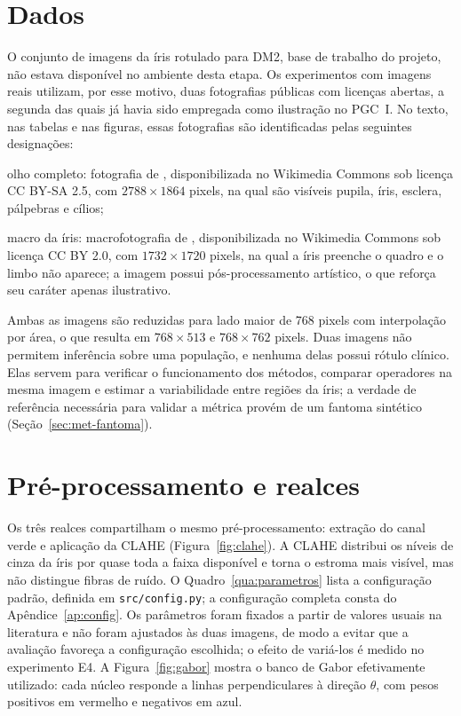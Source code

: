 \documentclass[12pt, oneside, a4paper, chapter=TITLE, section=TITLE,
               english, brazil]{abntex2}
\newcommand{\secao}[1]{\section[\texorpdfstring{\protect\MakeTextUppercase{#1}}{#1}]{#1}}
\newcommand{\arq}[1]{\nolinkurl{#1}}
\begin{document}
\secao{Dados}
\label{sec:met-dados}

O conjunto de imagens da íris rotulado para DM2, base de trabalho do projeto,
não estava disponível no ambiente desta etapa. Os experimentos com imagens
reais utilizam, por esse motivo, duas fotografias públicas com licenças
abertas, a segunda das quais já havia sido empregada como ilustração no
PGC~I. No texto, nas tabelas e nas figuras, essas fotografias são
identificadas pelas seguintes designações:
\begin{alineas}
  \item olho completo: fotografia de \citet{Novak2005}, disponibilizada no
  Wikimedia Commons sob licença CC BY-SA 2.5, com $2788 \times 1864$ pixels,
  na qual são visíveis pupila, íris, esclera, pálpebras e cílios;
  \item macro da íris: macrofotografia de \citet{Reyes2014}, disponibilizada
  no Wikimedia Commons sob licença CC BY 2.0, com $1732 \times 1720$ pixels,
  na qual a íris preenche o quadro e o limbo não aparece; a imagem possui
  pós-processamento artístico, o que reforça seu caráter apenas ilustrativo.
\end{alineas}

Ambas as imagens são reduzidas para lado maior de 768 pixels com interpolação
por área, o que resulta em $768 \times 513$ e $768 \times 762$ pixels. Duas
imagens não permitem inferência sobre uma população, e nenhuma delas possui
rótulo clínico. Elas servem para verificar o funcionamento dos métodos,
comparar operadores na mesma imagem e estimar a variabilidade entre regiões da
íris; a verdade de referência necessária para validar a métrica provém de um
fantoma sintético (Seção~\ref{sec:met-fantoma}).

\secao{Pré-processamento e realces}
\label{sec:met-realces}

Os três realces compartilham o mesmo pré-processamento: extração do canal
verde e aplicação da CLAHE (Figura~\ref{fig:clahe}). A CLAHE distribui os
níveis de cinza da íris por quase toda a faixa disponível e torna o estroma
mais visível, mas não distingue fibras de ruído. O
Quadro~\ref{qua:parametros} lista a configuração padrão, definida em
\arq{src/config.py}; a configuração completa consta do
Apêndice~\ref{ap:config}. Os parâmetros foram fixados a partir de valores
usuais na literatura e não foram ajustados às duas imagens, de modo a evitar
que a avaliação favoreça a configuração escolhida; o efeito de variá-los é
medido no experimento E4. A Figura~\ref{fig:gabor} mostra o banco de Gabor
efetivamente utilizado: cada núcleo responde a linhas perpendiculares à
direção $\theta$, com pesos positivos em vermelho e negativos em azul.
\end{document}
